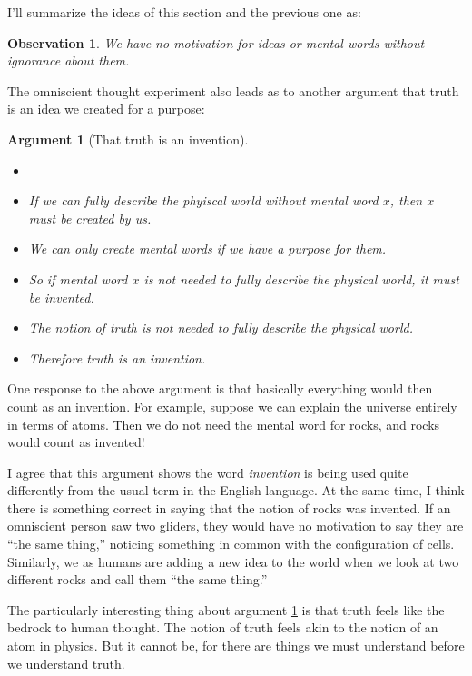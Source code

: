 \documentclass[11pt, oneside]{article}   	%
\newtheorem{obs}{Observation}
\newtheorem{argt}{Argument}
\begin{document}
I'll summarize the ideas of this section and the previous one as:
\begin{obs}\label{o5}
    We have no motivation for ideas or mental words without ignorance about
    them.
\end{obs}

The omniscient thought experiment also leads as to another argument that truth
is an idea we created for a purpose:

\begin{argt}[That truth is an invention]
    \label{a4}
    \normalfont
    \begin{itemize}
        \item[]
        \item If we can fully describe the phyiscal world without
            mental word $x$,
            then $x$ must be created by us.
        \item We can only create mental words if we have a purpose for them.
        \item So if mental word $x$ is not needed to fully describe the
            physical world, it must be invented.
        \item The notion of truth is not needed to fully describe the
            physical world.
        \item Therefore truth is an invention.
    \end{itemize}
\end{argt}

One response to the above argument is that basically everything would then count
as an invention. For example, suppose we can explain the universe entirely in
terms of atoms. Then we do not need the mental word for rocks, and rocks would
count as invented!

I agree that this argument shows the word {\em invention} is being used quite
differently from the usual term in the English language. At the same time, I
think there is something correct in saying that the notion of rocks was
invented. If an omniscient person saw two gliders, they would have no motivation
to say they are ``the same thing,'' noticing something in common with the
configuration of cells. Similarly, we as humans are adding a new idea to the
world when we look at two different rocks and call them ``the same thing.''

The particularly interesting thing about argument \ref{a4} is that truth feels
like the bedrock to human thought. The notion of truth feels akin to the notion
of an atom in physics. But it cannot be, for there are things we must understand
before we understand truth.
\end{document}
